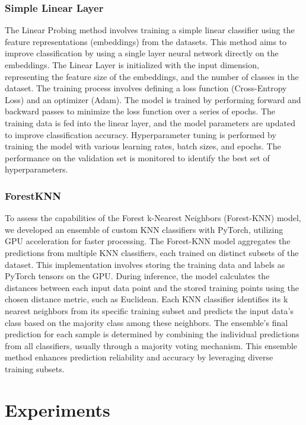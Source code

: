 \documentclass[a4paper]{article}
\begin{document}
\subsubsection{Simple Linear Layer}\label{simplelinearlayer}
The Linear Probing method involves training a simple linear classifier using the feature representations (embeddings) from the datasets. This method aims to improve classification by using a single layer neural network directly on the embeddings. The Linear Layer is initialized with the input dimension, representing the feature size of the embeddings, and the number of classes in the dataset. The training process involves defining a loss function (Cross-Entropy Loss) and an optimizer (Adam). The model is trained by performing forward and backward passes to minimize the loss function over a series of epochs. The training data is fed into the linear layer, and the model parameters are updated to improve classification accuracy. Hyperparameter tuning is performed by training the model with various learning rates, batch sizes, and epochs. The performance on the validation set is monitored to identify the best set of hyperparameters.

\subsubsection{ForestKNN}
To assess the capabilities of the Forest k-Nearest Neighbors (Forest-KNN) model, we developed an ensemble of custom KNN classifiers with PyTorch, utilizing GPU acceleration for faster processing. The Forest-KNN model aggregates the predictions from multiple KNN classifiers, each trained on distinct subsets of the dataset. This implementation involves storing the training data and labels as PyTorch tensors on the GPU. During inference, the model calculates the distances between each input data point and the stored training points using the chosen distance metric, such as Euclidean. Each KNN classifier identifies its k nearest neighbors from its specific training subset and predicts the input data's class based on the majority class among these neighbors. The ensemble's final prediction for each sample is determined by combining the individual predictions from all classifiers, usually through a majority voting mechanism. This ensemble method enhances prediction reliability and accuracy by leveraging diverse training subsets.

\section{Experiments}\label{experiments}
\end{document}
